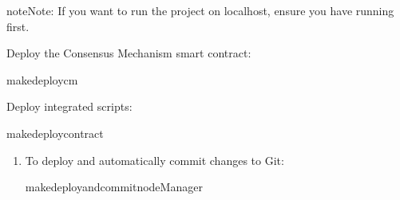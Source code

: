 \documentclass[letterpaper,10pt,english]{sphinxmanual}
\begin{document}
\begin{sphinxadmonition}{note}{Note:}
\sphinxAtStartPar
{} If you want to run the project on localhost, ensure you have  running first.

\sphinxAtStartPar
Deploy the Consensus Mechanism smart contract:

\begin{sphinxVerbatim}[commandchars=\\\{\}]
makedeploy\PYGZhy{}cm
\end{sphinxVerbatim}

\sphinxAtStartPar
Deploy integrated scripts:

\begin{sphinxVerbatim}[commandchars=\\\{\}]
makedeploy\PYGZhy{}contract
\end{sphinxVerbatim}
\end{sphinxadmonition}
\begin{enumerate}
%
\setcounter{enumi}{1}
\item {} 
\sphinxAtStartPar
{}

\sphinxAtStartPar
To deploy and automatically commit changes to Git:

\begin{sphinxVerbatim}[commandchars=\\\{\}]
makedeploy\PYGZhy{}and\PYGZhy{}commit\PYGZhy{}nodeManager
\end{sphinxVerbatim}

\end{enumerate}
\end{document}
